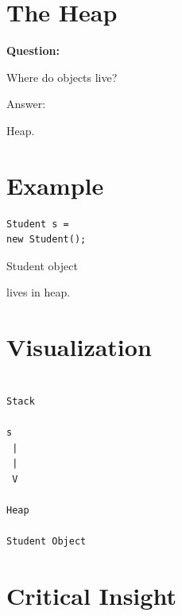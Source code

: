 \documentclass[11pt,a4paper]{book}
\begin{document}

\section{The Heap}

\textbf{Question:}


Where do objects live?


Answer:


Heap.


\section{Example}

\begin{verbatim} 
Student s =
new Student();
\end{verbatim}


Student object

lives in heap.


\section{Visualization}

\begin{verbatim}

Stack

s
 |
 |
 V

Heap

Student Object

\end{verbatim}


\section{Critical Insight}
\end{document}
